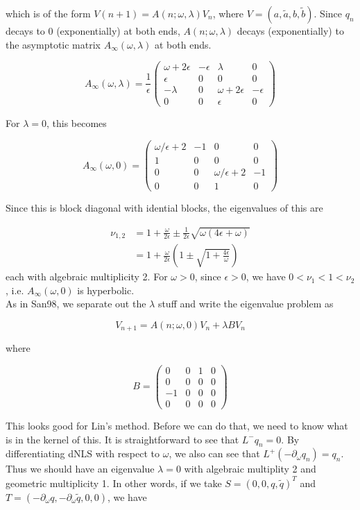 \documentclass[12pt]{article}
\begin{document}
which is of the form $V(n+1) = A(n; \omega, \lambda) V_n$, where $V = (a, \tilde{a}, b, \tilde{b})$. Since $q_n$ decays to 0 (exponentially) at both ends, $A(n; \omega, \lambda)$ decays (exponentially) to the asymptotic matrix $A_\infty(\omega, \lambda)$ at both ends.

\[
A_\infty(\omega, \lambda) = 
\frac{1}{\epsilon}
\begin{pmatrix}
\omega + 2 \epsilon & -\epsilon & \lambda & 0 \\
\epsilon & 0 & 0 & 0 \\
-\lambda & 0 & \omega + 2 \epsilon & -\epsilon \\
0 & 0 & \epsilon & 0
\end{pmatrix}
\]

For $\lambda = 0$, this becomes

\[
A_\infty(\omega, 0) = 
\begin{pmatrix}
\omega/\epsilon + 2 & -1 & 0 & 0 \\
1 & 0 & 0 & 0 \\
0 & 0 & \omega/\epsilon + 2 & -1\\
0 & 0 & 1 & 0
\end{pmatrix}
\]

Since this is block diagonal with idential blocks, the eigenvalues of this are 

\begin{align*}
\nu_{1,2} &= 1 + \frac{\omega}{2 \epsilon} \pm \frac{1}{2 \epsilon} \sqrt{\omega(4 \epsilon + \omega)} \\
&= 1 + \frac{\omega}{2 \epsilon} \left( 1 \pm \sqrt{1 + \frac{4 \epsilon}{\omega}} \right)
\end{align*}
each with algebraic multiplicity 2. For $\omega > 0$, since $\epsilon > 0$, we have $0 < \nu_1 < 1 < \nu_2$, i.e. $A_\infty(\omega, 0)$ is hyperbolic.\\

As in San98, we separate out the $\lambda$ stuff and write the eigenvalue problem as

\[
V_{n+1} = A(n; \omega, 0) V_n + \lambda B V_n
\]

where

\[
B = 
\begin{pmatrix}
0 & 0 & 1 & 0 \\
0 & 0 & 0 & 0 \\
-1 & 0 & 0 & 0 \\
0 & 0 & 0 & 0
\end{pmatrix}
\]

This looks good for Lin's method. Before we can do that, we need to know what is in the kernel of this. It is straightforward to see that $L^- q_n = 0$. By differentiating dNLS with respect to $\omega$, we also can see that $L^+ (-\partial_\omega q_n) = q_n$. Thus we should have an eigenvalue $\lambda = 0$ with algebraic multiplity 2 and geometric multiplicity 1. In other words, if we take $S = (0, 0, q, \tilde{q})^T$ and $T = (-\partial_\omega q, -\partial_\omega \tilde{q}, 0, 0)$, we have
\end{document}
